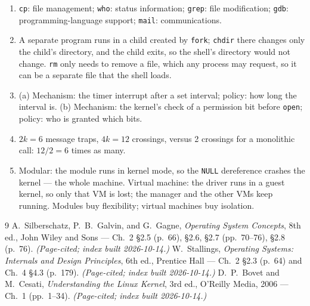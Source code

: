 \documentclass[11pt]{article}
\begin{document}
\begingroup\small
\begin{enumerate}
  \item \texttt{cp}: file management; \texttt{who}: status information;
        \texttt{grep}: file modification; \texttt{gdb}: programming-language
        support; \texttt{mail}: communications.
  \item A separate program runs in a child created by \texttt{fork};
        \texttt{chdir} there changes only the child's directory, and the child
        exits, so the shell's directory would not change. \texttt{rm} only
        needs to remove a file, which any process may request, so it can be a
        separate file that the shell loads.
  \item (a) Mechanism: the timer interrupt after a set interval; policy: how
        long the interval is. (b) Mechanism: the kernel's check of a permission
        bit before \texttt{open}; policy: who is granted which bits.
  \item $2k = 6$ message traps, $4k = 12$ crossings, versus 2 crossings for a
        monolithic call: $12/2 = 6$ times as many.
  \item Modular: the module runs in kernel mode, so the \texttt{NULL}
        dereference crashes the kernel --- the whole machine. Virtual machine:
        the driver runs in a guest kernel, so only that VM is lost; the manager
        and the other VMs keep running. Modules buy flexibility; virtual
        machines buy isolation.
\end{enumerate}
\endgroup

\begin{thebibliography}{9}
A.~Silberschatz, P.~B.~Galvin, and G.~Gagne, \emph{Operating System Concepts},
8th ed., John Wiley and Sons --- Ch.~2 \S2.5 (p.~66), \S2.6, \S2.7
(pp.~70--76), \S2.8 (p.~76). \emph{(Page-cited; index built 2026-10-14.)}
W.~Stallings, \emph{Operating Systems: Internals and Design Principles}, 6th
ed., Prentice Hall --- Ch.~2 \S2.3 (p.~64) and Ch.~4 \S4.3 (p.~179).
\emph{(Page-cited; index built 2026-10-14.)}
D.~P.~Bovet and M.~Cesati, \emph{Understanding the Linux Kernel}, 3rd ed.,
O'Reilly Media, 2006 --- Ch.~1 (pp.~1--34). \emph{(Page-cited; index built
2026-10-14.)}
\end{thebibliography}
\end{document}
